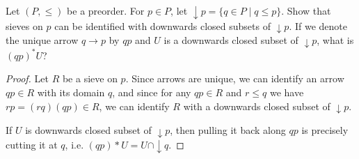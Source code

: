 \begin{exercise}{6}
    Let $(P, \leq)$ be a preorder. For $p\in P$, let $\downarrow p = \{q\in P\mid q\leq p\}$. Show that sieves on $p$ can be identified with downwards closed subsets of $\downarrow p$. If we denote the unique arrow $q\to p$ by $qp$ and $U$ is a downwards closed subset of $\downarrow p$, what is $(qp)^*U$?
    \begin{solution}
        \begin{proof}
            Let $R$ be a sieve on $p$. Since arrows are unique, we can identify an arrow $qp\in R$ with its domain $q$, and since for any $qp\in R$ and $r\leq q$ we have $rp=(rq)(qp)\in R$, we can identify $R$ with a downwards closed subset of $\downarrow p$.

            If $U$ is downwards closed subset of $\downarrow p$, then pulling it back along $qp$ is precisely cutting it at $q$, i.e. $(qp)*U=U\cap \downarrow q$.
        \end{proof}
    \end{solution}
\end{exercise}

